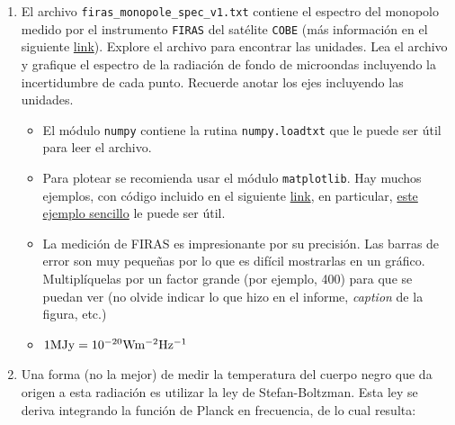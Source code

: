 \documentclass[letter, 11pt]{article}
\begin{document}
\begin{enumerate}
  
  \item El archivo \texttt{firas\_monopole\_spec\_v1.txt} contiene el espectro
    del monopolo medido por el instrumento \texttt{FIRAS} del satélite
    \texttt{COBE} (más información en el siguiente
    \href{https://lambda.gsfc.nasa.gov/product/cobe/firas_monopole_get.cfm}{link}).
    Explore el archivo para encontrar las unidades. Lea el archivo y grafique
    el espectro de la radiación de fondo de microondas incluyendo la
    incertidumbre de cada punto. Recuerde anotar los ejes incluyendo las unidades. 

    \begin{ayuda} 
      \small 
      \begin{itemize} 

        \item El módulo \texttt{numpy} contiene la rutina \texttt{numpy.loadtxt} que le puede
      ser útil para leer el archivo.  

        \item Para plotear se recomienda usar el módulo \texttt{matplotlib}.
          Hay muchos ejemplos, con código incluido en el siguiente
          \href{https://matplotlib.org/gallery.html}{link}, en particular,
          \href{https://matplotlib.org/examples/statistics/errorbar_demo.html}{este
          ejemplo sencillo} le puede ser útil.  

        \item La medición de FIRAS es impresionante por su precisión. Las
          barras de error son muy pequeñas por lo que es difícil mostrarlas en
          un gráfico. Multiplíquelas por un factor grande (por ejemplo, 400)
          para que se puedan ver (no olvide indicar lo que hizo en el informe,
          \emph{caption} de la figura, etc.)
        
        \item $1 {\rm MJy} = 10^{-20} {\rm W m^{-2} Hz^{-1}}$

      \end{itemize} 
    \end{ayuda}

  \item Una forma (no la mejor) de medir la temperatura del cuerpo negro que da
    origen a esta radiación es utilizar la ley de Stefan-Boltzman. Esta ley se
    deriva integrando la función de Planck en frecuencia, de lo cual resulta:


\end{enumerate}
\end{document}
